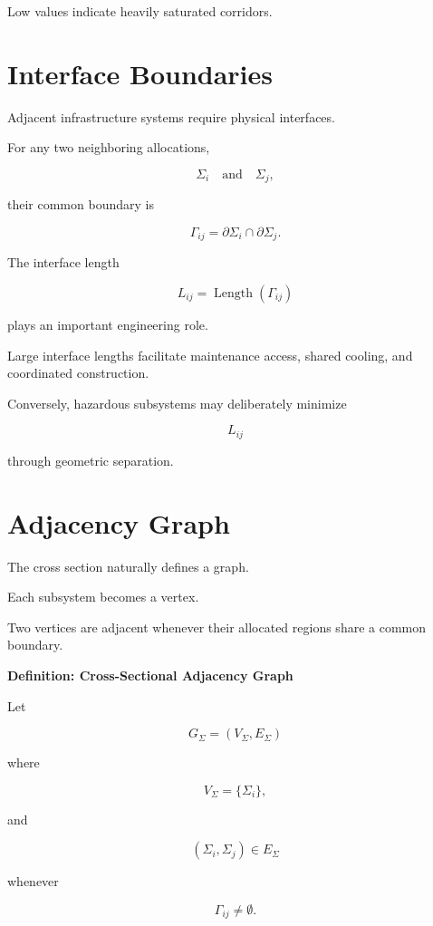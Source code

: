 \documentclass[11pt,fleqn]{book}
\numberwithin{equation}{chapter}
\newenvironment{definition}[1]
  {\begin{definitionEnv}
   \noindent\textbf{Definition: #1}\par\smallskip}
  {\end{definitionEnv}}
\theoremstyle{plain}
\theoremstyle{definition}
\theoremstyle{remark}
\begin{document}
Low values indicate heavily saturated corridors.


\section{Interface Boundaries}

Adjacent infrastructure systems require physical interfaces.

For any two neighboring allocations,

\[
\Sigma_i
\quad\text{and}\quad
\Sigma_j,
\]

their common boundary is

\[
\Gamma_{ij}
=
\partial\Sigma_i
\cap
\partial\Sigma_j.
\]


The interface length

\[
L_{ij}
=
\operatorname{Length}
(
\Gamma_{ij}
)
\]

plays an important engineering role.

Large interface lengths facilitate maintenance access,
shared cooling,
and coordinated construction.

Conversely,
hazardous subsystems may deliberately minimize

\[
L_{ij}
\]

through geometric separation.


\section{Adjacency Graph}

The cross section naturally defines a graph.

Each subsystem becomes a vertex.

Two vertices are adjacent whenever their allocated regions share a common
boundary.


\begin{definition}{Cross-Sectional Adjacency Graph}

Let

\[
G_\Sigma
=
(V_\Sigma,E_\Sigma)
\]

where

\[
V_\Sigma
=
\{
\Sigma_i
\},
\]

and

\[
(\Sigma_i,\Sigma_j)
\in
E_\Sigma
\]

whenever

\[
\Gamma_{ij}
\neq
\emptyset.
\]

\end{definition}
\end{document}
